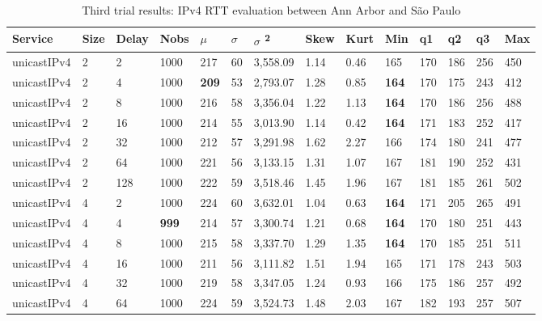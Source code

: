 \begin{table}[!htb]
\small
\centering
\caption{Third trial results: IPv4 RTT evaluation between Ann Arbor and São Paulo}
\label{tab:thirdtrialarbsaoipv4}
\begin{tabular}{@{}llllllllllllll@{}}
\toprule
Service    & Size & Delay & Nobs & $\mu$ & $\sigma$  & $\sigma$ \textsuperscript{2} & Skew & Kurt & Min & q1   & q2   & q3   & Max   \\ \midrule
unicastIPv4 & 2            & 2     & 1000 & 217  & 60  & 3,558.09 & 1.14     & 0.46     & 165 & 170 & 186 & 256 & 450  \\
unicastIPv4 & 2            & 4     & 1000 & \textbf{209}  & 53  & 2,793.07 & 1.28     & 0.85     & \textbf{164} & 170 & 175 & 243 & 412  \\
unicastIPv4 & 2            & 8     & 1000 & 216  & 58  & 3,356.04 & 1.22     & 1.13     & \textbf{164} & 170 & 186 & 256 & 488  \\
unicastIPv4 & 2            & 16    & 1000 & 214  & 55  & 3,013.90 & 1.14     & 0.42     & \textbf{164} & 171 & 183 & 252 & 417  \\
unicastIPv4 & 2            & 32    & 1000 & 212  & 57  & 3,291.98 & 1.62     & 2.27     & 166 & 174 & 180 & 241 & 477  \\
unicastIPv4 & 2            & 64    & 1000 & 221  & 56  & 3,133.15 & 1.31     & 1.07     & 167 & 181 & 190 & 252 & 431  \\
unicastIPv4 & 2            & 128   & 1000 & 222  & 59  & 3,518.46 & 1.45     & 1.96     & 167 & 181 & 185 & 261 & 502  \\ \hline
unicastIPv4 & 4            & 2     & 1000 & 224  & 60  & 3,632.01 & 1.04     & 0.63     & \textbf{164} & 171 & 205 & 265 & 491  \\
unicastIPv4 & 4            & 4     & \textbf{999}  & 214  & 57  & 3,300.74 & 1.21     & 0.68     & \textbf{164} & 170 & 180 & 251 & 443  \\
unicastIPv4 & 4            & 8     & 1000 & 215  & 58  & 3,337.70 & 1.29     & 1.35     & \textbf{164} & 170 & 185 & 251 & 511  \\
unicastIPv4 & 4            & 16    & 1000 & 211  & 56  & 3,111.82 & 1.51     & 1.94     & 165 & 171 & 178 & 243 & 503  \\
unicastIPv4 & 4            & 32    & 1000 & 219  & 58  & 3,347.05 & 1.24     & 0.93     & 166 & 175 & 186 & 257 & 492  \\
unicastIPv4 & 4            & 64    & 1000 & 224  & 59  & 3,524.73 & 1.48     & 2.03     & 167 & 182 & 193 & 257 & 507  \\

\end{tabular}
\end{table}
